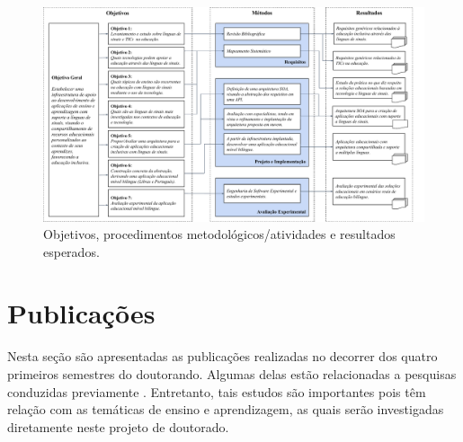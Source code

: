 \begin{figure}
\caption{Objetivos, procedimentos metodológicos/atividades e resultados esperados.}
\label{proposal:figure:objectives-methods-results}
\centerline{\includegraphics[width=\textwidth]{images/objectives-methods-results.pdf}}
\fautor
\end{figure}

\section{Publicações}

Nesta seção são apresentadas as publicações realizadas no decorrer dos quatro primeiros semestres do doutorando. Algumas delas estão relacionadas a pesquisas conduzidas previamente \cite{Soad2017_FIE, Oliveira2019_SBIE, FalvoJr2020_JUCS}. Entretanto, tais estudos são importantes pois têm relação com as temáticas de ensino e aprendizagem, as quais serão investigadas diretamente neste projeto de doutorado.

